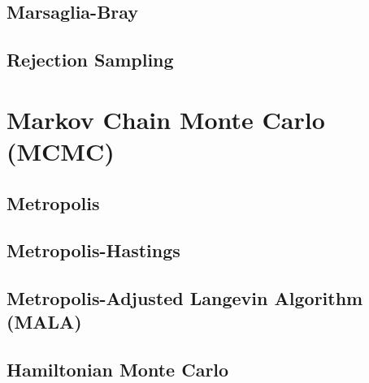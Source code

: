\documentclass{article}
\begin{document}
\subsection{Marsaglia-Bray}
\subsection{Rejection Sampling}

\section{Markov Chain Monte Carlo (MCMC)}
\subsection{Metropolis}
\subsection{Metropolis-Hastings}
\subsection{Metropolis-Adjusted Langevin Algorithm (MALA)}
\subsection{Hamiltonian Monte Carlo}







% 
% 
\end{document}
